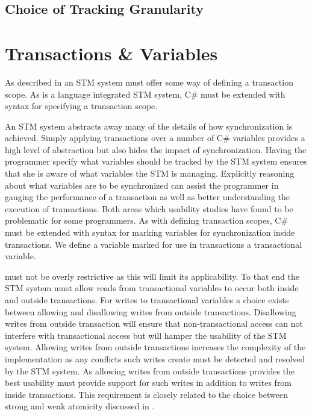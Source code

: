 \subsection{Choice of Tracking Granularity}

\section{Transactions \& Variables}
\label{subsec:rec_transactions_variables}
As described in  an \ac{STM} system must offer some way of defining a transaction scope. As \stmnamesp is a language integrated \ac{STM} system, C\# must be extended with syntax for specifying a transaction scope.

An \ac{STM} system abstracts away many of the details of how synchronization is achieved. Simply applying transactions over a number of C\# variables provides a high level of abstraction but also hides the impact of synchronization. Having the programmer specify what variables should be tracked by the \ac{STM} system ensures that she is aware of what variables the \ac{STM} is managing. Explicitly reasoning about what variables are to be synchronized can assist the programmer in gauging the performance of a transaction as well as better understanding the execution of transactions. Both areas which usability studies\cite{rossbach2010transactional}\cite{pankratius2009does} have found to be problematic for some programmers. As with defining transaction scopes, C\# must be extended with syntax for marking variables for synchronization inside transactions. We define a variable marked for use in transactions a transactional variable.

\stmnamesp must not be overly restrictive as this will limit its applicability. To that end the \ac{STM} system must allow reads from transactional variables to occur both inside and outside transactions. For writes to transactional variables a choice exists between allowing and disallowing writes from outside transactions. Disallowing writes from outside transaction will ensure that non-transactional access can not interfere with transactional access but will hamper the usability of the \ac{STM} system. Allowing writes from outside transactions increases the complexity of the implementation as any conflicts such writes create must be detected and resolved by the \ac{STM} system. As allowing writes from outside transactions provides the best usability \stmnamesp must provide support for such writes in addition to writes from inside transactions. This requirement is closely related to the choice between strong and weak atomicity discussed in .

